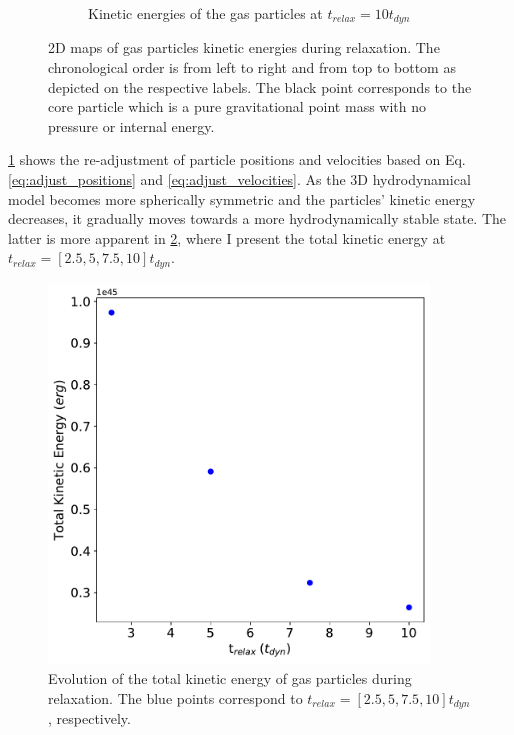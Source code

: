 \begin{figure}[H]
\begin{subfigure}[b]{0.49\textwidth}
        \caption[]%
        {{\small Kinetic energies of the gas particles at  $t_{relax} = 10t_{dyn}$}}
    \end{subfigure}
    \caption{2D maps of gas particles kinetic energies during relaxation.
    The chronological order is from left to right and from top to bottom as depicted on the respective labels. The black point corresponds to the core particle which is a pure gravitational point mass with no pressure or internal energy.}
    \label{fig:kin_energy_maps_relaxation}
\end{figure}
\cref{fig:kin_energy_maps_relaxation} shows the re-adjustment of particle positions and velocities based on Eq. \eqref{eq:adjust_positions} and \eqref{eq:adjust_velocities}. As the 3D hydrodynamical model becomes more spherically symmetric and the particles' kinetic energy decreases, it gradually moves towards a more hydrodynamically stable state. The latter is more apparent in \cref{fig:total_kin_energy_relaxation}, where
I present the total kinetic energy at $t_{relax} =[2.5, 5, 7.5, 10] t_{dyn}$.
\begin{figure}[H]
    \centering
    \includegraphics[width=0.9\textwidth]{Thesis/graphs/total_kientic_energy_during_relaxation.pdf}
    \caption{Evolution of the total kinetic energy of gas particles during relaxation. The blue points correspond to $t_{relax} =[2.5, 5, 7.5, 10] t_{dyn}$, respectively.}
    \label{fig:total_kin_energy_relaxation}
\end{figure}















